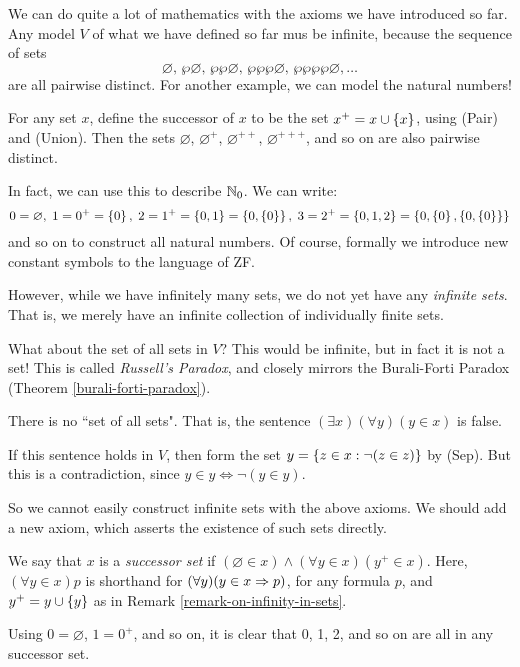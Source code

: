 \documentclass{article}
\begin{document}
\begin{remark}[Infinity]
	\label{remark-on-infinity-in-sets}
    We can do quite a lot of mathematics with the axioms we have introduced so far. Any model $V$ of what we have defined so far mus be infinite, because the sequence of sets
	\[
	\varnothing, \, \wp\varnothing, \, \wp\wp\varnothing, \, \wp\wp\wp\varnothing, \, \wp\wp\wp\wp\varnothing, \dots
	\]
	are all pairwise distinct. For another example, we can model the natural numbers!
	
	For any set $x$, define the successor of $x$ to be the set $x^+ = x \cup \left\lbrace x \right\rbrace$, using (Pair) and (Union). Then the sets $\varnothing$, $\varnothing^{+}$, $\varnothing^{++}$, $\varnothing^{+++}$, and so on are also pairwise distinct.
	
	In fact, we can use this to describe $\mathbb{N}_0$. We can write:
	\[
	0 = \varnothing, \;
	1 = 0^+ = \left\lbrace 0 \right\rbrace, \;
	2 = 1^+ = \left\lbrace 0, 1 \right\rbrace = \left\lbrace 0, \left\lbrace 0 \right\rbrace \right\rbrace, \;
	3 = 2^+ = \left\lbrace 0, 1, 2 \right\rbrace = \left\lbrace 0, \left\lbrace 0 \right\rbrace, \left\lbrace 0, \left\lbrace 0 \right\rbrace \right\rbrace \right\rbrace
	\]
	and so on to construct all natural numbers. Of course, formally we introduce new constant symbols to the language of ZF.
	
	However, while we have infinitely many sets, we do not yet have any \textit{infinite sets}. That is, we merely have an infinite collection of individually finite sets.
\end{remark}

What about the set of all sets in $V$? This would be infinite, but in fact it is not a set! This is called \textit{Russell's Paradox}, and closely mirrors the Burali-Forti Paradox (Theorem \ref{burali-forti-paradox}).

\begin{theorem}
	\label{russells-paradox}
	There is no ``set of all sets". That is, the sentence $(\exists x)(\forall y)(y \in x)$ is false.
\end{theorem}

\begin{prf}
	If this sentence holds in $V$, then form the set $y = \left\lbrace z \in x : \lnot(z \in z) \right\rbrace$ by (Sep). But this is a contradiction, since $y \in y \iff \lnot(y \in y)$.
\end{prf}

So we cannot easily construct infinite sets with the above axioms. We should add a new axiom, which asserts the existence of such sets directly.

\begin{definition}
	\label{successor-set}
    We say that $x$ is a \textit{successor set} if $(\varnothing \in x) \land (\forall y \in x)(y^+ \in x)$. Here, $(\forall y \in x)p$ is shorthand for $(\forall y)(y \in x \Rightarrow p)$, for any formula $p$, and $y^+ = y \cup \left\lbrace y \right\rbrace$ as in Remark \ref{remark-on-infinity-in-sets}.
    
    Using $0 = \varnothing$, $1 = 0^+$, and so on, it is clear that 0, 1, 2, and so on are all in any successor set.
\end{definition}
\end{document}
